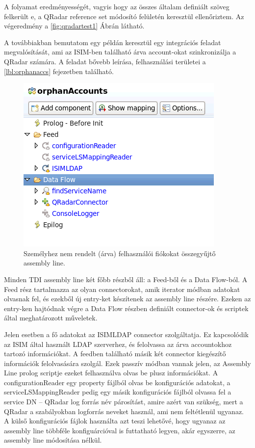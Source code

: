 A folyamat eredményességét, vagyis hogy az összes általam definiált szöveg felkerült e, a QRadar reference set módosító felületén keresztül ellenőriztem. Az végeredmény a \ref{fig:qradartest1} Ábrán látható. 
 
A továbbiakban bemutatom egy példán keresztül egy integrációs feladat megvalósítását, ami az ISIM-ben található árva account-okat szinkronizálja a QRadar számára. A feladat bővebb leírása, felhasználási területei a \ref{lbl:orphanaccs} fejezetben található. 

\begin{figure}[h]
	\centering
	\includegraphics[width=0.6\linewidth]{figures/conn_test/queryAssemblyLineSmall}
	\caption{Személyhez nem rendelt (árva) felhasználói fiókokat összegyűjtő assembly line.}
	\label{fig:queryassemblyline}
\end{figure}

Minden TDI assembly line két főbb részből áll: a Feed-ből és a Data Flow-ból. A Feed rész tartalmazza az olyan connectorokat, amik iterator módban adatokat olvasnak fel, és ezekből új entry-ket készítenek az assembly line részére. Ezeken az entry-ken hajtódnak végre a Data Flow részben definiált connector-ok és scriptek által meghatározott műveletek.

Jelen esetben a fő adatokat az ISIMLDAP connector szolgáltatja. Ez kapcsolódik az ISIM által használt LDAP szerverhez, és felolvassa az árva accountokhoz tartozó információkat. A feedben található másik két connector kiegészítő információk felolvasására szolgál. Ezek passzív módban vannak jelen, az Assembly Line prolog scriptje ezeket felhasználva olvas be plusz információkat. A configurationReader egy property fájlból olvas be konfigurációs adatokat, a serviceLSMappingReader pedig egy másik konfigurációs fájlból olvassa fel a service DN -- QRadar log forrás név párosítást, amire azért van szükség, mert a QRadar a szabályokban logforrás neveket használ, ami nem feltétlenül ugyanaz. A külső konfigurációs fájlok használta azt teszi lehetővé, hogy ugyanaz az assembly line többféle konfiguárcióval is futtatható legyen, akár egyszerre, az assembly line módosítása nélkül.

